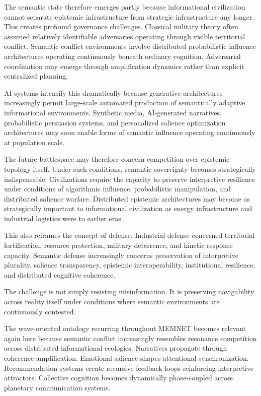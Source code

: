 \documentclass[11pt,a4paper]{article}
\begin{document}
The semantic state therefore emerges partly because informational civilization cannot separate epistemic infrastructure from strategic infrastructure any longer. This creates profound governance challenges. Classical military theory often assumed relatively identifiable adversaries operating through visible territorial conflict. Semantic conflict environments involve distributed probabilistic influence architectures operating continuously beneath ordinary cognition. Adversarial coordination may emerge through amplification dynamics rather than explicit centralized planning.

AI systems intensify this dramatically because generative architectures increasingly permit large-scale automated production of semantically adaptive informational environments. Synthetic media, AI-generated narratives, probabilistic persuasion systems, and personalized salience optimization architectures may soon enable forms of semantic influence operating continuously at population scale.

The future battlespace may therefore concern competition over epistemic topology itself. Under such conditions, semantic sovereignty becomes strategically indispensable. Civilizations require the capacity to preserve interpretive resilience under conditions of algorithmic influence, probabilistic manipulation, and distributed salience warfare. Distributed epistemic architectures may become as strategically important to informational civilization as energy infrastructure and industrial logistics were to earlier eras.

This also reframes the concept of defense. Industrial defense concerned territorial fortification, resource protection, military deterrence, and kinetic response capacity. Semantic defense increasingly concerns preservation of interpretive plurality, salience transparency, epistemic interoperability, institutional resilience, and distributed cognitive coherence.

The challenge is not simply resisting misinformation. It is preserving navigability across reality itself under conditions where semantic environments are continuously contested.

The wave-oriented ontology recurring throughout MEMNET becomes relevant again here because semantic conflict increasingly resembles resonance competition across distributed informational ecologies. Narratives propagate through coherence amplification. Emotional salience shapes attentional synchronization. Recommendation systems create recursive feedback loops reinforcing interpretive attractors. Collective cognition becomes dynamically phase-coupled across planetary communication systems.
\end{document}
